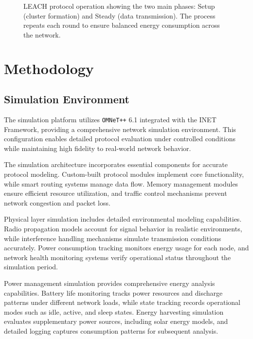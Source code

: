 \documentclass[conference]{IEEEtran}
\begin{document}
\begin{figure}[!t]
\caption{LEACH protocol operation showing the two main phases: Setup (cluster formation) and Steady (data transmission). The process repeats each round to ensure balanced energy consumption across the network.}
\label{fig:leach_operation}
\end{figure}

\section{Methodology}

\subsection{Simulation Environment}
The simulation platform utilizes \texttt{OMNeT++} 6.1 integrated with the INET Framework, providing a comprehensive network simulation environment. This configuration enables detailed protocol evaluation under controlled conditions while maintaining high fidelity to real-world network behavior.

The simulation architecture incorporates essential components for accurate protocol modeling. Custom-built protocol modules implement core functionality, while smart routing systems manage data flow. Memory management modules ensure efficient resource utilization, and traffic control mechanisms prevent network congestion and packet loss.

Physical layer simulation includes detailed environmental modeling capabilities. Radio propagation models account for signal behavior in realistic environments, while interference handling mechanisms simulate transmission conditions accurately. Power consumption tracking monitors energy usage for each node, and network health monitoring systems verify operational status throughout the simulation period.

Power management simulation provides comprehensive energy analysis capabilities. Battery life monitoring tracks power resources and discharge patterns under different network loads, while state tracking records operational modes such as idle, active, and sleep states. Energy harvesting simulation evaluates supplementary power sources, including solar energy models, and detailed logging captures consumption patterns for subsequent analysis.
\end{document}
